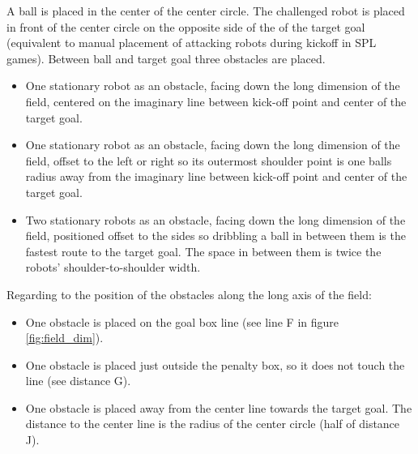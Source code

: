 A ball is placed in the center of the center circle. The challenged robot is placed in front of the center circle on the opposite side of the of the target goal (equivalent to manual placement of attacking robots during kickoff in SPL games). Between ball and target goal three obstacles are placed.

\begin{itemize}
	\item One stationary robot as an obstacle, facing down the long dimension of the field, centered on the imaginary line between kick-off point and center of the target goal.
	\item One stationary robot as an obstacle, facing down the long dimension of the field, offset to the left or right so its outermost shoulder point is one balls radius away from the imaginary line between kick-off point and center of the target goal. %
	\item Two stationary robots as an obstacle, facing down the long dimension of the field, positioned offset to the sides so dribbling a ball in between them is the fastest route to the target goal. The space in between them is twice the robots' shoulder-to-shoulder width. %
\end{itemize}

Regarding to the position of the obstacles along the long axis of the field:

\begin{itemize}
	\item One obstacle is placed on the goal box line (see line F in figure \ref{fig:field_dim}).
	\item One obstacle is placed just outside the penalty box, so it does not touch the line (see distance  G).
	\item One obstacle is placed away from the center line towards the target goal. The distance to the center line is the radius of the center circle (half of distance J).
\end{itemize}


